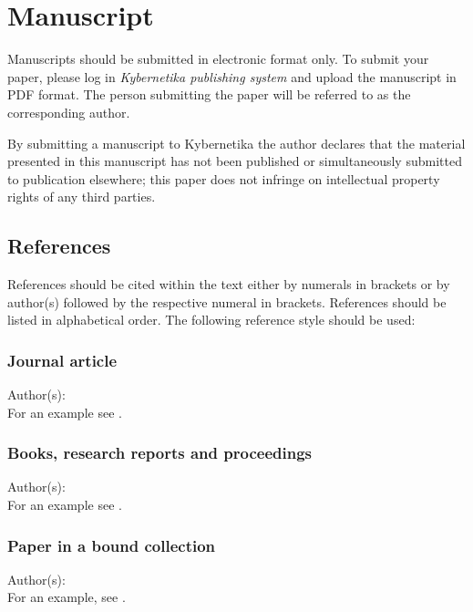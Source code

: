 \documentclass{kybernetika}
\begin{document}
\section{Manuscript}
Manuscripts should be submitted in electronic format only. To submit your paper, please log in {\it Kybernetika publishing system} and upload the manuscript in PDF format.
The person submitting the paper will be referred to as the corresponding author.

By submitting a manuscript to Kybernetika the author declares that the material presented in this manuscript has not been published or simultaneously submitted to publication elsewhere; this paper does not infringe on intellectual property rights of any third parties.

\subsection{References}
References should be cited within the text either by numerals in brackets or by author(s) followed by the respective numeral in brackets. References should be listed in alphabetical order. The following reference style should be used:

\subsubsection{Journal article}
Author(s):
\\
For an example see \cite{P}.

\subsubsection{Books, research reports and proceedings}
Author(s):  
\\
For an example see \cite{B}.

\subsubsection{Paper in a bound collection}
Author(s):  
\\
For an example, see \cite{PC}.
\end{document}
